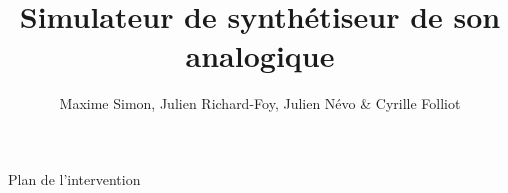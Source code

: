 \documentclass[frenchb]{beamer}
\title[M2GL-VET]{Simulateur de synthétiseur de son analogique}
\author{Maxime Simon, Julien Richard-Foy, Julien Névo \& Cyrille Folliot}
\institute[ISTIC]{Université de Rennes 1}
\begin{document}
	
	\begin{frame}
	\titlepage

	
	\end{frame}
	
	
		\begin{frame}{Plan de l'intervention}
			\tableofcontents
		\end{frame}
	
\end{document}
